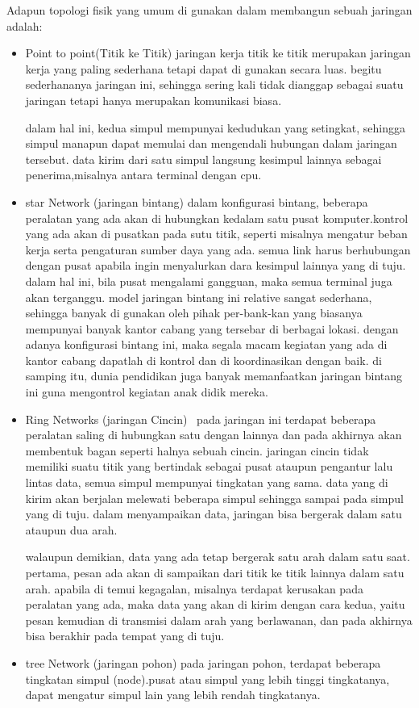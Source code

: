 Adapun topologi fisik yang umum di gunakan dalam membangun sebuah jaringan adalah:
\begin{itemize}
  \item Point to point(Titik ke Titik)
        jaringan kerja titik ke titik merupakan jaringan kerja yang paling sederhana tetapi dapat di gunakan secara luas. begitu sederhananya jaringan ini, sehingga sering kali tidak dianggap sebagai suatu jaringan tetapi hanya merupakan komunikasi biasa.

        dalam hal ini, kedua simpul mempunyai kedudukan yang setingkat, sehingga simpul manapun dapat memulai dan mengendali hubungan dalam jaringan tersebut. data kirim dari satu simpul langsung kesimpul lainnya sebagai penerima,misalnya antara terminal dengan cpu.
  \item  star Network (jaringan bintang)
         dalam konfigurasi bintang, beberapa peralatan yang ada akan di hubungkan kedalam satu pusat komputer.kontrol yang ada akan di pusatkan pada sutu titik, seperti misalnya mengatur beban kerja serta pengaturan sumber daya yang ada. semua link harus berhubungan dengan pusat apabila ingin menyalurkan dara kesimpul lainnya yang di tuju. dalam hal ini, bila pusat mengalami gangguan, maka semua terminal juga akan terganggu. model jaringan bintang ini relative sangat sederhana, sehingga banyak di gunakan oleh pihak per-bank-kan yang biasanya mempunyai banyak kantor cabang yang tersebar di berbagai lokasi. dengan adanya konfigurasi bintang ini, maka segala macam kegiatan yang ada di kantor cabang dapatlah di kontrol dan di koordinasikan dengan baik. di samping itu, dunia pendidikan juga banyak memanfaatkan jaringan bintang ini guna mengontrol kegiatan anak didik mereka.
  \item Ring Networks (jaringan Cincin)
  \     pada jaringan ini terdapat beberapa peralatan saling
        di hubungkan satu dengan lainnya dan pada akhirnya akan membentuk bagan seperti halnya sebuah cincin. jaringan cincin tidak memiliki suatu titik yang bertindak sebagai pusat ataupun pengantur lalu lintas data, semua simpul mempunyai tingkatan yang sama. data yang di kirim akan berjalan melewati beberapa simpul sehingga sampai pada simpul yang di tuju. dalam menyampaikan data, jaringan bisa bergerak dalam satu ataupun dua arah.

        walaupun demikian, data yang ada tetap bergerak satu arah dalam satu saat. pertama, pesan ada akan di sampaikan dari titik ke titik lainnya dalam satu arah. apabila di temui kegagalan, misalnya terdapat kerusakan pada peralatan yang ada, maka data yang akan di kirim dengan cara kedua, yaitu pesan kemudian di transmisi dalam arah yang berlawanan, dan pada akhirnya bisa berakhir pada tempat yang di tuju.
  \item tree Network (jaringan pohon)
        pada jaringan pohon, terdapat beberapa tingkatan simpul (node).pusat atau simpul yang lebih tinggi tingkatanya, dapat mengatur simpul lain yang lebih rendah tingkatanya.
\end{itemize} 
